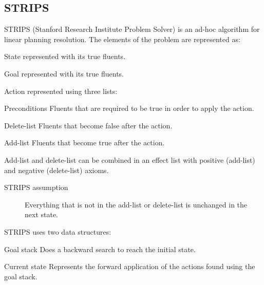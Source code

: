 \subsection{STRIPS}
STRIPS (Stanford Research Institute Problem Solver) is an ad-hoc algorithm
for linear planning resolution.
The elements of the problem are represented as:
\begin{descriptionlist}
    \item[State] represented with its true fluents.
    \item[Goal] represented with its true fluents.
    \item[Action] represented using three lists:
        \begin{descriptionlist}
            \item[Preconditions] Fluents that are required to be true in order to apply the action.
            \item[Delete-list] Fluents that become false after the action.
            \item[Add-list] Fluents that become true after the action.
        \end{descriptionlist}
        Add-list and delete-list can be combined in an effect list with positive (add-list) and negative (delete-list) axioms.

        \begin{description}
            \item[STRIPS assumption] Everything that is not in the add-list or delete-list is unchanged in the next state. 
        \end{description}
\end{descriptionlist}

STRIPS uses two data structures:
\begin{descriptionlist}
    \item[Goal stack] Does a backward search to reach the initial state.
    \item[Current state] Represents the forward application of the actions found using the goal stack.
\end{descriptionlist}

